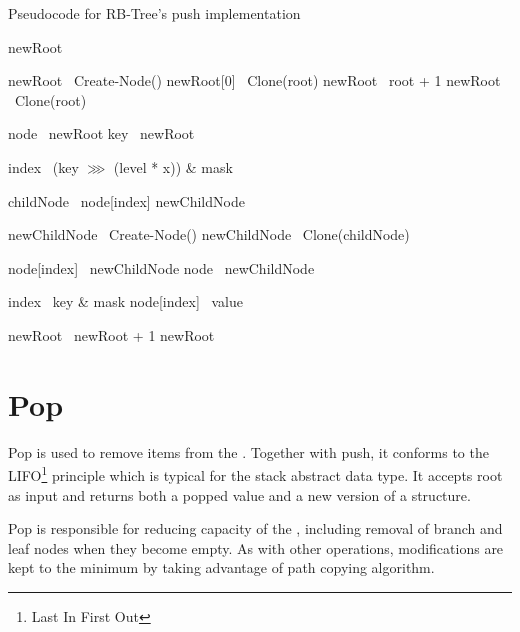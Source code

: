 \begin{listing}[ht!]
    \caption{Pseudocode for RB-Tree's push implementation}
    \label{lst:rb-tree-push}

    \begin{algorithmic}
            \State newRoot \la\ \nil{}

                \State newRoot \la\ Create-Node()
                \State newRoot[0] \la\ Clone(root)
                \State newRoot \la\ root + 1
            \Else
                \State newRoot \la\ Clone(root)
            \EndIf

            \State node \la\ newRoot
            \State key \la\ newRoot

                \State index \la\ (key $\ggg$ (level * x)) \& mask

                \State childNode \la\ node[index]
                \State newChildNode \la\ \nil{}

                    \State newChildNode \la\ Create-Node()
                \Else
                    \State newChildNode \la\ Clone(childNode)
                \EndIf

                \State node[index] \la\ newChildNode
                \State node \la\ newChildNode
            \EndFor

            \State index \la\ key \& mask
            \State node[index] \la\ value

            \State newRoot \la\ newRoot + 1
            \State \Return newRoot
        \EndFunction
    \end{algorithmic}
\end{listing}

\section{Pop}

Pop is used to remove items from the \rbtree. Together with push, it conforms to the LIFO\footnote{Last In First Out} principle which is typical for the stack abstract data type. It accepts root as input and returns both a popped value and a new version of a structure.

Pop is responsible for reducing capacity of the \rbtree{}, including removal of branch and leaf nodes when they become empty. As with other operations, modifications are kept to the minimum by taking advantage of path copying algorithm.

